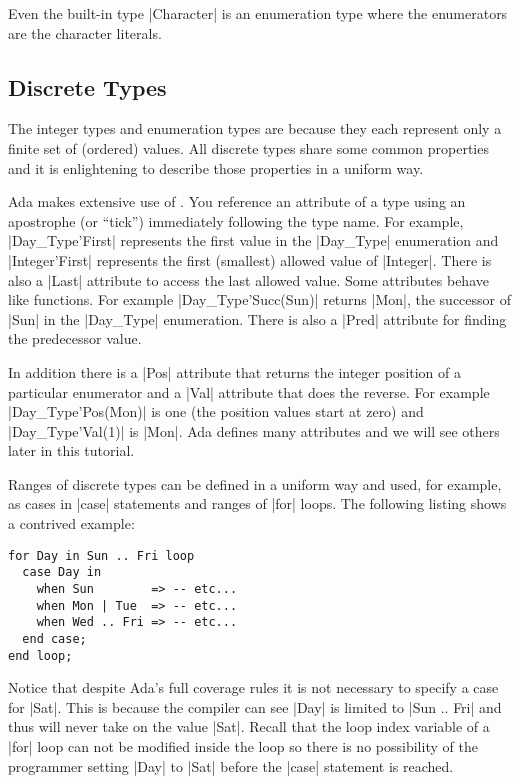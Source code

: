 \noindent Even the built-in type |Character| is an enumeration type where the enumerators are
the character literals.

\subsection{Discrete Types}

The integer types and enumeration types are  because they each represent
only a finite set of (ordered) values. All discrete types share some common properties and it is
enlightening to describe those properties in a uniform way.

Ada makes extensive use of . You reference an attribute of a type using an
apostrophe (or ``tick'') immediately following the type name. For example, |Day_Type'First|
represents the first value in the |Day_Type| enumeration and |Integer'First| represents the
first (smallest) allowed value of |Integer|. There is also a |Last| attribute to access the last
allowed value. Some attributes behave like functions. For example |Day_Type'Succ(Sun)| returns
|Mon|, the successor of |Sun| in the |Day_Type| enumeration. There is also a |Pred| attribute
for finding the predecessor value.

In addition there is a |Pos| attribute that returns the integer position of a particular
enumerator and a |Val| attribute that does the reverse. For example |Day_Type'Pos(Mon)| is one
(the position values start at zero) and |Day_Type'Val(1)| is |Mon|. Ada defines many attributes
and we will see others later in this tutorial.

Ranges of discrete types can be defined in a uniform way and used, for example, as cases in
|case| statements and ranges of |for| loops. The following listing shows a contrived example:

\begin{lstlisting}
for Day in Sun .. Fri loop
  case Day in
    when Sun        => -- etc...
    when Mon | Tue  => -- etc...
    when Wed .. Fri => -- etc...
  end case;
end loop;
\end{lstlisting}

\noindent Notice that despite Ada's full coverage rules it is not necessary to specify a case
for |Sat|. This is because the compiler can see |Day| is limited to |Sun .. Fri| and thus will
never take on the value |Sat|. Recall that the loop index variable of a |for| loop can not be
modified inside the loop so there is no possibility of the programmer setting |Day| to |Sat|
before the |case| statement is reached.

